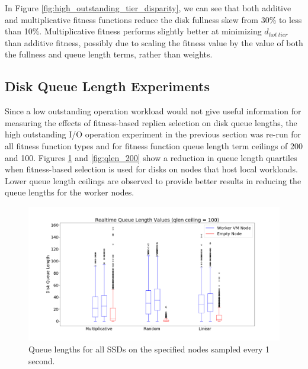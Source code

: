 \documentclass[12pt]{article}
\begin{document}
    In Figure \ref{fig:high_outstanding_tier_disparity}, we can see that both
    additive and multiplicative fitness functions reduce the disk fullness skew
    from 30\% to less than 10\%. Multiplicative fitness performs slightly
    better at minimizing $d_{hot\ tier}$ than additive fitness, possibly due to
    scaling the fitness value by the value of both the fullness and queue
    length terms, rather than weights.
  
  \subsection{Disk Queue Length Experiments}

  Since a low outstanding operation workload would not give useful
  information for measuring the effects of fitness-based replica selection on
  disk queue lengths, the high outstanding I/O operation experiment in the
  previous section was re-run for all fitness function types and for fitness
  function queue length term ceilings of 200 and 100. Figures
  \ref{fig:qlen_100} and \ref{fig:qlen_200} show a reduction in
  queue length quartiles when fitness-based selection is used for disks on
  nodes that host local workloads. Lower queue length ceilings are
  observed to provide better results in reducing the queue lengths for the
  worker nodes.

  \begin{figure}[!htb]
    \centering
    \includegraphics[scale=0.32]{images/qlen_100_box.png} 
    \caption{Queue lengths for all SSDs on the specified nodes sampled every 1
             second.}
    \label{fig:qlen_100}
  \end{figure}
\end{document}

